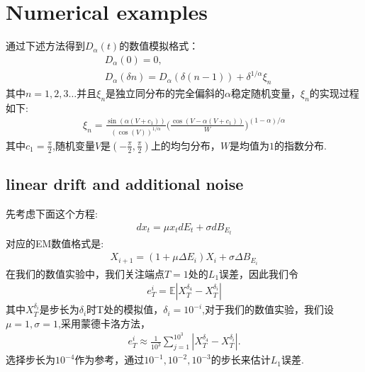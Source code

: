 \documentclass[12pt,final]{article}
\numberwithin{equation}{section}
\numberwithin{figure}{section}
\numberwithin{table}{section}
\theoremstyle{plain}
\theoremstyle{definition}
\theoremstyle{remark}
\begin{document}
\section{Numerical examples}
通过下述方法得到$D_\alpha(t)$的数值模拟格式：\\
\begin{align*}
	&D_{\alpha}(0)=0,\\
	&D_{\alpha}(\delta n)=D_{\alpha}(\delta(n-1))+\delta^{1/\alpha}\xi_{n}
\end{align*}
其中$n=1,2,3 \ldots$并且$\xi_n$是独立同分布的完全偏斜的$\alpha$稳定随机变量，$\xi_n$的实现过程如下:
\begin{align*}
	\xi_n=\frac{\sin(\alpha(V+c_1))}{\left(\cos(V)\right)^{1/\alpha}}\Big(\frac{\cos(V-\alpha(V+c_1))}{W}\Big)^{(1-\alpha)/\alpha}
\end{align*}
其中$c_1 = \frac{\pi}{2}$,随机变量$V$是$(-\frac{\pi}{2},\frac{\pi}{2})$上的均匀分布，$W$是均值为$1$的指数分布.
\subsection{linear drift and additional noise}
先考虑下面这个方程:
\begin{align*}
	dx_t = \mu x_tdE_t + \sigma dB_{E_t}
\end{align*}
对应的EM数值格式是:
\begin{align*}
	X_{i+1} = (1 + \mu \Delta E_i) X_i + \sigma \Delta B_{E_i}
\end{align*}
在我们的数值实验中，我们关注端点$T = 1$处的$L_1$误差，因此我们令
\begin{align*}
	e_T^{i}=\mathbb{E}\left|X_T^{\delta _4}-X_T^{\delta _i}\right|
\end{align*}
其中$X_T^{\delta _i}$是步长为$\delta _i$时T处的模拟值，$\delta _i = 10^{-i}$,对于我们的数值实验，我们设$\mu=1,\sigma=1$,采用蒙德卡洛方法，
\begin{align*}
	e_{T}^i\approx\frac{1}{10^3}\sum_{j=1}^{10^3}\left|X_T^{\delta _4}-X_T^{\delta _i}\right|.
\end{align*}
选择步长为$10^{-4}$作为参考，通过${10^{-1},10^{-2},10^{-3}}$的步长来估计$L_1$误差.
\end{document}

